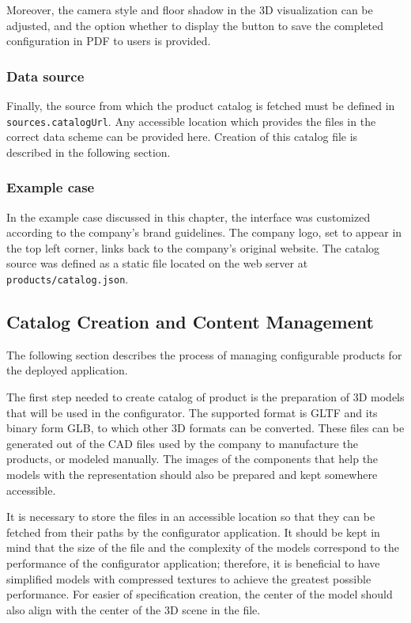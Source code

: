 Moreover, the camera style and floor shadow in the 3D visualization can be adjusted, and the option whether to display the button to save the completed configuration in PDF to users is provided.


\subsubsection{Data source}

Finally, the source from which the product catalog is fetched must be defined in \texttt{sources.catalogUrl}. Any accessible location which provides the files in the correct data scheme can be provided here. Creation of this catalog file is described in the following section.


\subsubsection{Example case}

In the example case discussed in this chapter, the interface was customized according to the company's brand guidelines. The company logo, set to appear in the top left corner, links back to the company's original website. The catalog source was defined as a static file located on the web server at \texttt{products/catalog.json}.


\subsection{Catalog Creation and Content Management}


The following section describes the process of managing configurable products for the deployed application.

The first step needed to create catalog of product is the preparation of 3D models that will be used in the configurator. The supported format is GLTF and its binary form GLB, to which other 3D formats can be converted. These files can be generated out of the CAD files used by the company to manufacture the products, or modeled manually. The images of the components that help the models with the representation should also be prepared and kept somewhere accessible.

It is necessary to store the files in an accessible location so that they can be fetched from their paths by the configurator application. It should be kept in mind that the size of the file and the complexity of the models correspond to the performance of the configurator application; therefore, it is beneficial to have simplified models with compressed textures to achieve the greatest possible performance. For easier of specification creation, the center of the model should also align with the center of the 3D scene in the file.

